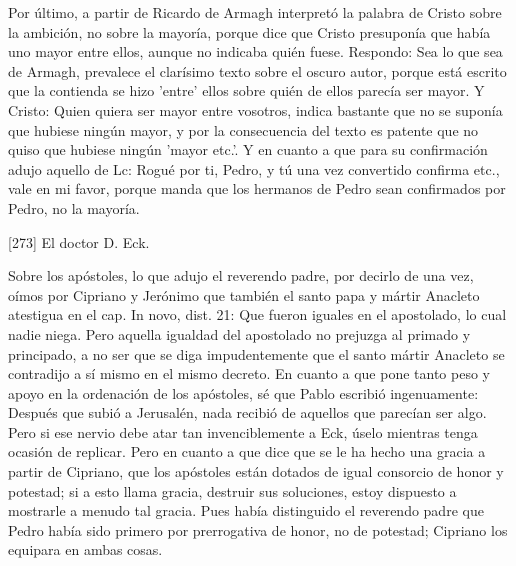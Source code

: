 Por último, a partir de Ricardo de Armagh interpretó la palabra de Cristo sobre la ambición, no sobre la mayoría, porque dice que Cristo presuponía que había uno mayor entre ellos, aunque no indicaba quién fuese. Respondo: Sea lo que sea de Armagh, prevalece el clarísimo texto sobre el oscuro autor, porque está escrito que la contienda se hizo 'entre' ellos sobre quién de ellos parecía ser mayor. Y Cristo: Quien quiera ser mayor entre vosotros, indica bastante que no se suponía que hubiese ningún mayor, y por la consecuencia del texto es patente que no quiso que hubiese ningún 'mayor etc.'. Y en cuanto a que para su confirmación adujo aquello de Lc: Rogué por ti, Pedro, y tú una vez convertido confirma etc., vale en mi favor, porque manda que los hermanos de Pedro sean confirmados por Pedro, no la mayoría.

[273] El doctor D. Eck.

Sobre los apóstoles, lo que adujo el reverendo padre, por decirlo de una vez, oímos por Cipriano y Jerónimo que también el santo papa y mártir Anacleto atestigua en el cap. In novo, dist. 21: Que fueron iguales en el apostolado, lo cual nadie niega. Pero aquella igualdad del apostolado no prejuzga al primado y principado, a no ser que se diga impudentemente que el santo mártir Anacleto se contradijo a sí mismo en el mismo decreto. En cuanto a que pone tanto peso y apoyo en la ordenación de los apóstoles, sé que Pablo escribió ingenuamente: Después que subió a Jerusalén, nada recibió de aquellos que parecían ser algo. Pero si ese nervio debe atar tan invenciblemente a Eck, úselo mientras tenga ocasión de replicar. Pero en cuanto a que dice que se le ha hecho una gracia a partir de Cipriano, que los apóstoles están dotados de igual consorcio de honor y potestad; si a esto llama gracia, destruir sus soluciones, estoy dispuesto a mostrarle a menudo tal gracia. Pues había distinguido el reverendo padre que Pedro había sido primero por prerrogativa de honor, no de potestad; Cipriano los equipara en ambas cosas.

